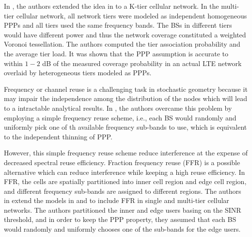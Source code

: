 \documentclass[a4paper,twocolumn]{IEEEtran}
\begin{document}
In \cite{Dhillon2012JSAC}, the authors extended the idea in \cite{Andrews2011TC} to a K-tier cellular network. In the multi-tier cellular network, all network tiers were modeled as independent homogeneous PPPs and all tiers used the same frequency bands. The BSs in different tiers would have different power and thus the network coverage constituted a weighted Voronoi tessellation. The authors computed the tier association probability and the average tier load. It was shown that the PPP assumption is accurate to within $1-2$ dB of the measured coverage probability in an actual LTE network overlaid by heterogeneous tiers modeled as PPPs.

Frequency or channel reuse is a challenging task in stochastic geometry because it may impair the independence among the distribution of the nodes which will lead to a intractable analytical results. In \cite{Andrews2011TC}, the authors overcame this problem by employing a simple frequency reuse scheme, i.e., each BS would randomly and uniformly pick one of th available frequency sub-bands to use, which is equivalent to the independent thinning of PPP. 

However, this simple frequency reuse scheme reduce interference at the expense of decreased spectral reuse efficiency. Fraction frequency reuse (FFR) is a possible alternative which can reduce interference while keeping a high reuse efficiency\cite{Novlan2011TWC}\cite{Novlan2012TC}. In FFR, the cells are spatially partitioned into inner cell region and edge cell region, and different frequency sub-bands are assigned to different regions. The authors in \cite{Novlan2011TWC}\cite{Novlan2012TC} extend the models in \cite{Andrews2011TC} and \cite{Dhillon2012JSAC} to include FFR in single and multi-tier cellular networks. The authors partitioned the inner and edge users basing on the SINR threshold, and in order to keep the PPP property, they assumed that each BS would randomly and uniformly chooses one of the sub-bands for the edge users.
\end{document}
